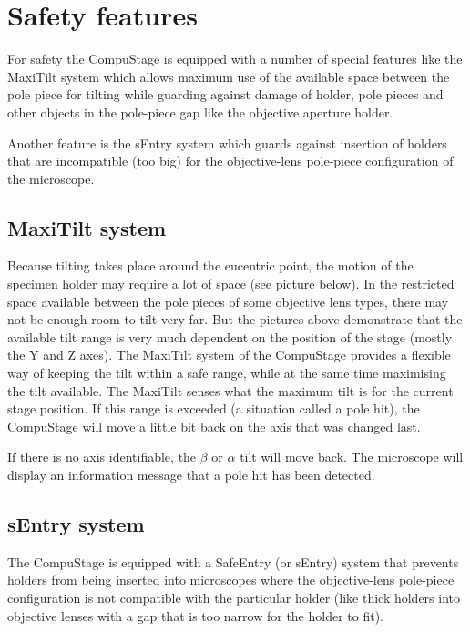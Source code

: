 \documentclass[12pt]{article}
\begin{document}
\section{Safety features}
For safety the CompuStage is equipped with a number of special features
like the MaxiTilt system which allows maximum use of the available space
between the pole piece for tilting while guarding against damage of
holder, pole pieces and other objects in the pole-piece gap like the
objective aperture holder.

Another feature is the sEntry system which guards against insertion of
holders that are incompatible (too big) for the objective-lens
pole-piece configuration of the microscope.

\subsection{MaxiTilt system}

Because tilting takes place around the eucentric point, the motion of
the specimen holder may require a lot of space (see picture below).
In the restricted space available between the pole pieces of some
objective lens types, there may not be enough room to tilt very far.
But the pictures above demonstrate that the available tilt range is
very much dependent on the position of the stage (mostly the Y
and Z axes). The MaxiTilt system of the CompuStage provides a flexible
way of keeping the tilt within a safe range, while at the same time
maximising the tilt available. The MaxiTilt senses what the maximum
tilt is for the current stage position. If this range is exceeded
(a situation called a pole hit), the CompuStage will move a little bit
back on the axis that was changed last.

If there is no axis identifiable, the $\beta$ or $\alpha$ tilt will move
back. The microscope will display an information message that a pole
hit has been detected.


\subsection{sEntry system}

The CompuStage is equipped with a SafeEntry (or sEntry) system that
prevents holders from being inserted into microscopes where the
objective-lens pole-piece configuration is not compatible with the
particular holder (like thick holders into objective lenses with a
gap that is too narrow for the holder to fit).
\end{document}
